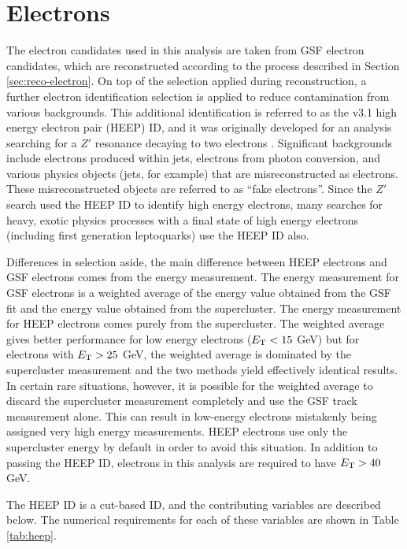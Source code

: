 \section{Electrons}
\label{sec:id-electron}

The electron candidates used in this analysis are
taken from GSF electron candidates, which are 
reconstructed according to the
process described in Section \ref{sec:reco-electron}.
On top of the selection applied during reconstruction,
a further electron identification selection is applied to 
reduce contamination from
various backgrounds.
This additional identification is referred to as the v3.1
high energy electron pair (HEEP) ID, 
and it was originally developed for an analysis searching for a $Z'$ resonance
decaying to two electrons \cite{zprime-2011}.
Significant backgrounds include electrons produced within jets,
electrons from photon conversion,
and various physics objects (jets, for example) that are 
misreconstructed as electrons.  These misreconstructed objects
are referred to as ``fake electrons''.
Since the $Z'$ search used the HEEP ID to identify high energy electrons, many searches for heavy,
exotic physics processes with a final state of high energy electrons (including 
first generation leptoquarks) use the HEEP ID also.

Differences in selection aside, the main difference
between HEEP electrons and GSF electrons comes from the energy measurement.
The energy measurement for GSF electrons is a weighted average
of the energy value obtained from the GSF fit and the energy value obtained from the supercluster.
The energy measurement for HEEP electrons comes purely from the supercluster.
The weighted average gives better performance for low energy electrons ($E_{\text{T}} < 15$ GeV)
but for electrons with $E_{\text{T}} > 25$ GeV, the weighted average is dominated
by the supercluster measurement and the two methods yield effectively identical results.
In certain rare situations, however, it is possible for the weighted average to discard
the supercluster measurement completely and use the GSF track measurement alone.  This can
result in low-energy electrons mistakenly being assigned very high energy measurements.
HEEP electrons use only the supercluster energy by default in order to avoid this situation.
In addition to passing the HEEP ID,
electrons in this analysis are required to have $E_{\text{T}} > 40$ GeV.

The HEEP ID is a cut-based ID, and the contributing variables are 
described below.
The numerical requirements for each of these variables are shown
in Table \ref{tab:heep}.


